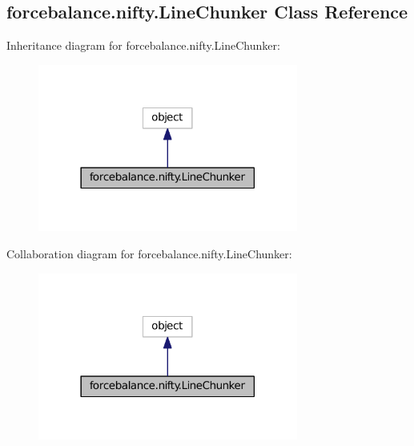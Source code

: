 \hypertarget{classforcebalance_1_1nifty_1_1LineChunker}{\subsection{forcebalance.\-nifty.\-Line\-Chunker Class Reference}
\label{classforcebalance_1_1nifty_1_1LineChunker}
}


Inheritance diagram for forcebalance.\-nifty.\-Line\-Chunker\-:\nopagebreak
\begin{figure}[H]
\begin{center}
\leavevmode
\includegraphics[width=242pt]{classforcebalance_1_1nifty_1_1LineChunker__inherit__graph}
\end{center}
\end{figure}


Collaboration diagram for forcebalance.\-nifty.\-Line\-Chunker\-:\nopagebreak
\begin{figure}[H]
\begin{center}
\leavevmode
\includegraphics[width=242pt]{classforcebalance_1_1nifty_1_1LineChunker__coll__graph}
\end{center}
\end{figure}
